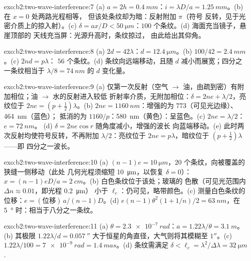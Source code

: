\begin{solution}{exo:b2:two-wave-interference:7}
(a) $a = 2h = \qty{0.4}{mm}$：$i = \lambda D/a = \qty{1.25}{mm}$。(b) 在 $x = 0$ 处两路光程相等，
但该处条纹却为暗：反射附加 $\pi$（符号
反转，见于光密介质上的掠入射）。(c) $\delta = ax/D <
\qty{50}{\micro m}$：$100$ 个条纹。(d) 海面充当镜子，悬崖顶部的
天线充当屏：光源升高时，条纹掠过，
由此给出其仰角。
\end{solution}

\begin{solution}{exo:b2:two-wave-interference:8}
(a) $2d = 42\lambda$：$d = \qty{12.4}{\micro m}$。(b) $100/42 = \qty{2.4}{mm}$。(c) $2nd = p\lambda$：
$56$ 个条纹。(d) 条纹向远端移动，且随 $d$
减小而展宽；四分之一条纹相当于 $\lambda/8 = \qty{74}{nm}$ 的 $d$ 变化量。
\end{solution}

\begin{solution}{exo:b2:two-wave-interference:9}
(a) 仅第一次反射（空气 $\to$ 油，由疏到密）有附加相位；油 $\to$ 水的反射进入较低
折射率介质，无附加相位：$\delta = 2ne + \lambda/2$，亮纹位于 $2ne = (p + \tfrac12)\lambda$。(b) $2ne =
\qty{1160}{nm}$：增强的为 $773$（可见光边缘）、\qty{464}{nm}（蓝色）；
抵消的为 $1160/p$：\qty{580}{nm}（黄色）：呈蓝色。(c) $2ne = \lambda/2$：$e = \qty{72}{nm}$。
(d) $\delta = 2ne\cos r$ 随角度减小，增强的波长
向蓝端移动。(e) 此时两次反射均使符号反转，不再附加
$\lambda/2$：亮纹位于 $2ne = p\lambda$，暗纹位于 $(p + \tfrac12)\lambda$——即
四分之一波长。
\end{solution}

\begin{solution}{exo:b2:two-wave-interference:10}
(a) $(n - 1)e = \qty{10}{\micro m}$，$20$ 个条纹，向被覆盖的狭缝一侧移动（此处
几何光程须缩短 \qty{10}{\micro m}，以恢复 $\delta = 0$）：
$x = (n - 1)eD/a = \qty{2}{cm}$。(b) 白色条纹位于该处；玻璃的
色散（可见光范围内 $\Delta n \approx 0.01$，即光程 \qty{0.2}{\micro m}）
小于 $\ell_c$：仍可见，略带颜色。(c) 测量白色条纹的
位移：$e = (\text{位移})\,a/(n - 1)D$。(d) $e(n - 1)\theta^2
(1 + 1/n)/2 = \qty{63}{nm}$，在 \qty{5}{\degree} 时：相当于八分之一条纹。
\end{solution}

\begin{solution}{exo:b2:two-wave-interference:11}
(a) $\theta = \qty{2.3e-7}{rad}$：$a = 1.22\lambda/\theta = \qty{3.1}{m}$。(b) 其极限 $1.22\lambda/d =
\qty{0.057}{''}$ 大于恒星的角直径，大气则将其模糊至
$1''$。(c) $1.22\lambda/100 = \qty{7e-9}{rad} = \qty{1.4}{mas}$。(d) 条纹需满足
$\delta < \ell_c = \lambda^2/\Delta\lambda = \qty{32}{\micro m}$.
\end{solution}

